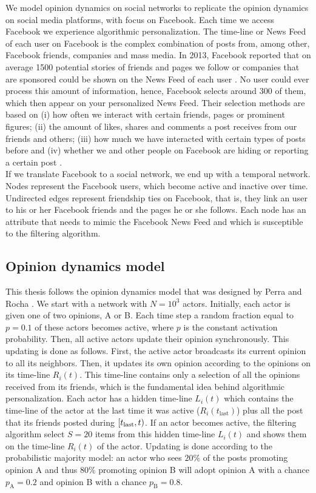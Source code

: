 \documentclass[11 pt , letterpaper , twoside , openright]{book}
\begin{document}
We model opinion dynamics on social networks to replicate the opinion dynamics on social media platforms, with focus on Facebook. Each time we access Facebook we experience algorithmic personalization. The time-line or News Feed of each user on Facebook is the complex combination of posts from, among other, Facebook friends, companies and mass media. In 2013, Facebook reported that on average 1500 potential stories of friends and pages we follow or companies that are sponsored could be shown on the News Feed of each user \cite{facebook}. No user could ever process this amount of information, hence, Facebook selects around 300 of them, which then appear on your personalized News Feed. Their selection methods are based on (i) how often we interact with certain friends, pages or prominent figures; (ii) the amount of likes, shares and comments a post receives from our friends and others; (iii) how much we have interacted with certain types of posts before and (iv) whether we and other people on Facebook are hiding or reporting a certain post \cite{facebook}. \\
\newline
If we translate Facebook to a social network, we end up with a temporal network. Nodes represent the Facebook users, which become active and inactive over time. Undirected edges represent friendship ties on Facebook, that is, they link an user to his or her Facebook friends and the pages he or she follows. Each node has an attribute that needs to mimic the Facebook News Feed and which is susceptible to the filtering algorithm.

\subsection{Opinion dynamics model}

This thesis follows the opinion dynamics model that was designed by Perra and Rocha \cite{Perra2019}. We start with a network with $N = 10^3$ actors.  Initially, each actor is given one of two opinions, A or B. Each time step a random fraction equal to $p= 0.1$ of these actors becomes active, where $p$ is the constant activation probability. Then, all active actors update their opinion synchronously. This updating is done as follows. First, the active actor broadcasts its current opinion to all its neighbors. Then, it updates its own opinion according to the opinions on its time-line $R_i(t)$. This time-line contains only a selection of all the opinions received from its friends, which is the fundamental idea behind algorithmic personalization. Each actor has a hidden time-line $L_i(t)$ which contains the time-line of the actor at the last time it was active ($R_i(t_{\text{last}})$) plus all the post that its friends posted during $\interval[right open fence =), open right]{t_\text{last}}{t}$. If an actor becomes active, the filtering algorithm select $S = 20$ items from this hidden time-line $L_i(t)$ and shows them on the time-line $R_i(t)$ of the actor. Updating is done according to the probabilistic majority model: an actor who sees $20\%$ of the posts promoting opinion A and thus $80\%$ promoting opinion B will adopt opinion A with a chance $p_\text{A} = 0.2$ and opinion B with a chance $p_\text{B} = 0.8$.
\end{document}
